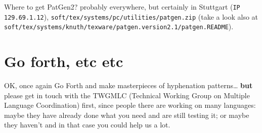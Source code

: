 Where to get PatGen2? probably everywhere, but certainly in
Stuttgart ({\tt IP 129.69.1.12}),
\verb=soft/tex/systems/pc/utilities/patgen.zip= (take a look also at
\verb=soft/tex/systems/knuth/texware/patgen.version2.1/patgen.README=).

\section{Go forth, etc etc}
OK, once again {\sc Go Forth} and make masterpieces of hyphenation
patterns\ldots
{\bf but} please get in touch with the TWGMLC (Technical Working
Group on Multiple Language Coordination) first, since people there
are working on many languages: maybe they have already done what
you need and are still testing it; or maybe they haven't and in
that case you could help us a lot.




